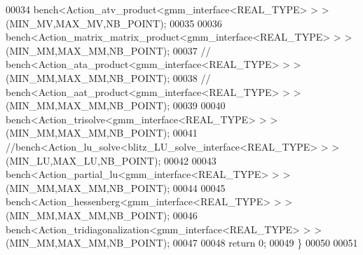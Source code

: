 \begin{DoxyCode}
00034   bench<Action\_atv\_product<gmm\_interface<REAL\_TYPE> > >(MIN\_MV,MAX\_MV,NB\_POINT);
00035 
00036   bench<Action\_matrix\_matrix\_product<gmm\_interface<REAL\_TYPE> > >(MIN\_MM,MAX\_MM,NB\_POINT);
00037 \textcolor{comment}{//   bench<Action\_ata\_product<gmm\_interface<REAL\_TYPE> > >(MIN\_MM,MAX\_MM,NB\_POINT);}
00038 \textcolor{comment}{//   bench<Action\_aat\_product<gmm\_interface<REAL\_TYPE> > >(MIN\_MM,MAX\_MM,NB\_POINT);}
00039 
00040   bench<Action\_trisolve<gmm\_interface<REAL\_TYPE> > >(MIN\_MM,MAX\_MM,NB\_POINT);
00041   \textcolor{comment}{//bench<Action\_lu\_solve<blitz\_LU\_solve\_interface<REAL\_TYPE> > >(MIN\_LU,MAX\_LU,NB\_POINT);}
00042 
00043   bench<Action\_partial\_lu<gmm\_interface<REAL\_TYPE> > >(MIN\_MM,MAX\_MM,NB\_POINT);
00044   
00045   bench<Action\_hessenberg<gmm\_interface<REAL\_TYPE> > >(MIN\_MM,MAX\_MM,NB\_POINT);
00046   bench<Action\_tridiagonalization<gmm\_interface<REAL\_TYPE> > >(MIN\_MM,MAX\_MM,NB\_POINT);
00047 
00048   \textcolor{keywordflow}{return} 0;
00049 \}
00050 
00051 
\end{DoxyCode}
